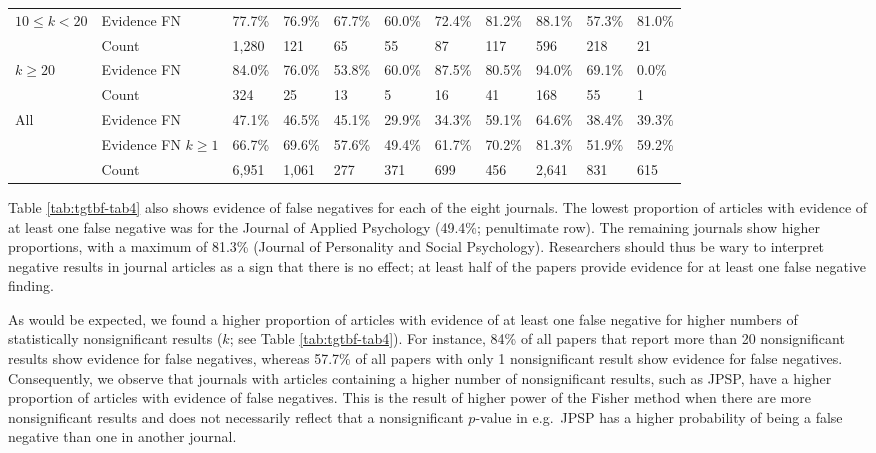 \documentclass[a5paper]{book}
\begin{document}
\begin{table}[!h]
{\begin{tabular}{lllllllllll}
$10\leq k<20$ & Evidence FN & 77.7\% & 76.9\% & 67.7\% & 60.0\% & 72.4\% & 81.2\% & 88.1\% & 57.3\% & 81.0\%\\
\rowcolor{gray!6}   & Count & 1,280 & 121 & 65 & 55 & 87 & 117 & 596 & 218 & 21\\
\addlinespace
$k\geq20$ & Evidence FN & 84.0\% & 76.0\% & 53.8\% & 60.0\% & 87.5\% & 80.5\% & 94.0\% & 69.1\% & 0.0\%\\
\rowcolor{gray!6}   & Count & 324 & 25 & 13 & 5 & 16 & 41 & 168 & 55 & 1\\
All & Evidence FN & 47.1\% & 46.5\% & 45.1\% & 29.9\% & 34.3\% & 59.1\% & 64.6\% & 38.4\% & 39.3\%\\
\rowcolor{gray!6}   & Evidence FN $k\geq1$ & 66.7\% & 69.6\% & 57.6\% & 49.4\% & 61.7\% & 70.2\% & 81.3\% & 51.9\% & 59.2\%\\
 & Count & 6,951 & 1,061 & 277 & 371 & 699 & 456 & 2,641 & 831 & 615\\
\bottomrule
\end{tabular}}
\end{table}

Table \ref{tab:tgtbf-tab4} also shows evidence of false negatives for
each of the eight journals. The lowest proportion of articles with
evidence of at least one false negative was for the Journal of Applied
Psychology (49.4\%; penultimate row). The remaining journals show higher
proportions, with a maximum of 81.3\% (Journal of Personality and Social
Psychology). Researchers should thus be wary to interpret negative
results in journal articles as a sign that there is no effect; at least
half of the papers provide evidence for at least one false negative
finding.

As would be expected, we found a higher proportion of articles with
evidence of at least one false negative for higher numbers of
statistically nonsignificant results (\(k\); see Table
\ref{tab:tgtbf-tab4}). For instance, 84\% of all papers that report more
than 20 nonsignificant results show evidence for false negatives,
whereas 57.7\% of all papers with only 1 nonsignificant result show
evidence for false negatives. Consequently, we observe that journals
with articles containing a higher number of nonsignificant results, such
as JPSP, have a higher proportion of articles with evidence of false
negatives. This is the result of higher power of the Fisher method when
there are more nonsignificant results and does not necessarily reflect
that a nonsignificant \(p\)-value in e.g.~JPSP has a higher probability
of being a false negative than one in another journal.
\end{document}
